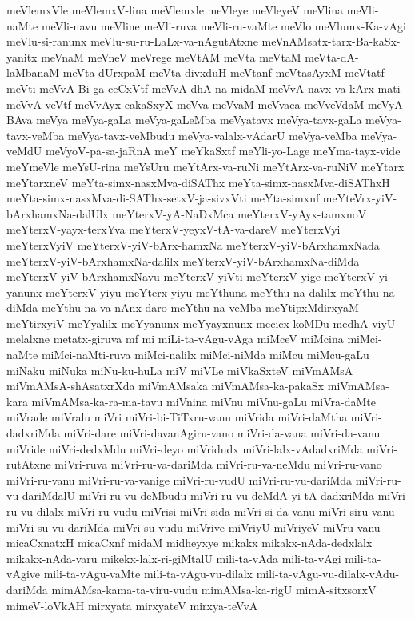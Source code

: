 {meVlemxVle
meVlemxV-lina
meVlemxle
meVleye
meVleyeV
meVlina
meVli-naMte
meVli-navu
meVline
meVli-ruva
meVli-ru-vaMte
meVlo
meVlumx-Ka-vAgi
meVlu-si-ranunx
meVlu-su-ru-LaLx-va-nAgutAtxne
meVnAMsatx-tarx-Ba-kaSx-yanitx
meVnaM
meVneV
meVrege
meVtAM
meVta
meVtaM
meVta-dA-laMbanaM
meVta-dUrxpaM
meVta-divxduH
meVtanf
meVtasAyxM
meVtatf
meVti
meVvA-Bi-ga-ceCxVtf
meVvA-dhA-na-midaM
meVvA-navx-va-kArx-mati
meVvA-veVtf
meVvAyx-cakaSxyX
meVva
meVvaM
meVvaca
meVveVdaM
meVyA-BAva
meVya
meVya-gaLa
meVya-gaLeMba
meVyatavx
meVya-tavx-gaLa
meVya-tavx-veMba
meVya-tavx-veMbudu
meVya-valalx-vAdarU
meVya-veMba
meVya-veMdU
meVyoV-pa-sa-jaRnA
meY
meYkaSxtf
meYli-yo-Lage
meYma-tayx-vide
meYmeVle
meYsU-rina
meYsUru
meYtArx-va-ruNi
meYtArx-va-ruNiV
meYtarx
meYtarxneV
meYta-simx-nasxMva-diSAThx
meYta-simx-nasxMva-diSAThxH
meYta-simx-nasxMva-di-SAThx-setxV-ja-sivxVti
meYta-simxnf
meYteVrx-yiV-bArxhamxNa-dalUlx
meYterxV-yA-NaDxMca
meYterxV-yAyx-tamxnoV
meYterxV-yayx-terxYva
meYterxV-yeyxV-tA-va-dareV
meYterxVyi
meYterxVyiV
meYterxV-yiV-bArx-hamxNa
meYterxV-yiV-bArxhamxNada
meYterxV-yiV-bArxhamxNa-dalilx
meYterxV-yiV-bArxhamxNa-diMda
meYterxV-yiV-bArxhamxNavu
meYterxV-yiVti
meYterxV-yige
meYterxV-yi-yanunx
meYterxV-yiyu
meYterx-yiyu
meYthuna
meYthu-na-dalilx
meYthu-na-diMda
meYthu-na-va-nAnx-daro
meYthu-na-veMba
meYtipxMdirxyaM
meYtirxyiV
meYyalilx
meYyanunx
meYyayxnunx
mecicx-koMDu
medhA-viyU
melalxne
metatx-giruva
mf
mi
miLi-ta-vAgu-vAga
miMceV
miMcina
miMci-naMte
miMci-naMti-ruva
miMci-nalilx
miMci-niMda
miMcu
miMcu-gaLu
miNaku
miNuka
miNu-ku-huLa
miV
miVLe
miVkaSxteV
miVmAMsA
miVmAMsA-shAsatxrXda
miVmAMsaka
miVmAMsa-ka-pakaSx
miVmAMsa-kara
miVmAMsa-ka-ra-ma-tavu
miVnina
miVnu
miVnu-gaLu
miVra-daMte
miVrade
miVralu
miVri
miVri-bi-TiTxru-vanu
miVrida
miVri-daMtha
miVri-dadxriMda
miVri-dare
miVri-davanAgiru-vano
miVri-da-vana
miVri-da-vanu
miVride
miVri-dedxMdu
miVri-deyo
miVridudx
miVri-lalx-vAdadxriMda
miVri-rutAtxne
miVri-ruva
miVri-ru-va-dariMda
miVri-ru-va-neMdu
miVri-ru-vano
miVri-ru-vanu
miVri-ru-va-vanige
miVri-ru-vudU
miVri-ru-vu-dariMda
miVri-ru-vu-dariMdalU
miVri-ru-vu-deMbudu
miVri-ru-vu-deMdA-yi-tA-dadxriMda
miVri-ru-vu-dilalx
miVri-ru-vudu
miVrisi
miVri-sida
miVri-si-da-vanu
miVri-siru-vanu
miVri-su-vu-dariMda
miVri-su-vudu
miVrive
miVriyU
miVriyeV
miVru-vanu
micaCxnatxH
micaCxnf
midaM
midheyxye
mikakx
mikakx-nAda-dedxlalx
mikakx-nAda-varu
mikekx-lalx-ri-giMtalU
mili-ta-vAda
mili-ta-vAgi
mili-ta-vAgive
mili-ta-vAgu-vaMte
mili-ta-vAgu-vu-dilalx
mili-ta-vAgu-vu-dilalx-vAdu-dariMda
mimAMsa-kama-ta-viru-vudu
mimAMsa-ka-rigU
mimA-sitxsorxV
mimeV-loVkAH
mirxyata
mirxyateV
mirxya-teVvA
}
